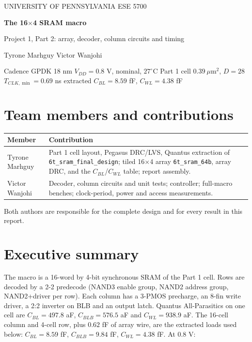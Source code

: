 \documentclass[10pt,letterpaper]{article}
\newcommand{\code}[1]{\texttt{#1}}
\begin{document}
\begin{center}
{\small UNIVERSITY OF PENNSYLVANIA \quad ESE 5700}\par\vspace{6pt}
{\Huge\bfseries The 16$\times$4 SRAM macro}\par\vspace{3pt}
{\large Project 1, Part 2: array, decoder, column circuits and timing}\par\vspace{8pt}
Tyrone Marhguy \quad\textbullet\quad Victor Wanjohi\par\vspace{6pt}
\colorbox{pale}{\parbox{.95\linewidth}{\small\centering Cadence GPDK 18 nm \quad $V_{DD}=0.8$ V, nominal, $27^\circ$C \quad Part 1 cell $0.39\ \mu$m$^2$, $D=28$ \quad $T_{CLK,\min}=0.69$ ns \quad extracted $C_{BL}=8.59$ fF, $C_{WL}=4.38$ fF}}
\end{center}

\section*{Team members and contributions}
\begin{tabularx}{\linewidth}{@{}lX@{}}\toprule Member & Contribution\\\midrule
Tyrone Marhguy & Part 1 cell layout, Pegasus DRC/LVS, Quantus extraction of \code{6t\_sram\_final\_design}; tiled 16$\times$4 array \code{6t\_sram\_64b}, array DRC, and the $C_{BL}$/$C_{WL}$ table; report assembly.\\
Victor Wanjohi & Decoder, column circuits and unit tests; controller; full-macro benches; clock-period, power and access measurements.\\
\bottomrule\end{tabularx}
Both authors are responsible for the complete design and for every result in this report.

\section*{Executive summary}
The macro is a 16-word by 4-bit synchronous SRAM of the Part 1 cell. Rows are decoded by a 2-2 predecode (NAND3 enable group, NAND2 address group, NAND2+driver per row). Each column has a 3-PMOS precharge, an 8-fin write driver, a 2:2 inverter on BLB and an output latch. Quantus All-Parasitics on one cell are $C_{BL}=497.8$ aF, $C_{BLB}=576.5$ aF and $C_{WL}=938.9$ aF. The 16-cell column and 4-cell row, plus $0.62$ fF of array wire, are the extracted loads used below: $C_{BL}=8.59$ fF, $C_{BLB}=9.84$ fF, $C_{WL}=4.38$ fF. At $0.8$ V:
\end{document}
